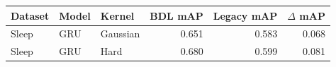 \begin{tabular}{lllrrr}
\toprule
Dataset & Model & Kernel & BDL mAP & Legacy mAP & $\Delta$ mAP \\
\midrule
Sleep & GRU & Gaussian & 0.651 & 0.583 & 0.068 \\
Sleep & GRU & Hard & 0.680 & 0.599 & 0.081 \\
\bottomrule
\end{tabular}
